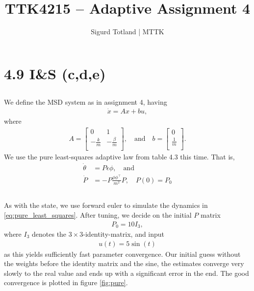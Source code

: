 \documentclass[]{article}
\title{TTK4215 – Adaptive Assignment 4}
\author{Sigurd Totland | MTTK}
\begin{document}
\maketitle

\section{4.9 I\&S (c,d,e)}
\setcounter{subsection}{2}
\subsection{}
We define the MSD system as in assignment 4, having
\begin{equation}\begin{aligned}
\dot x = Ax + bu,
\end{aligned}\end{equation}
where
\begin{equation}\begin{aligned}
A =
\begin{bmatrix}
0 & 1 \\
-\frac{k}{m} & -\frac{\beta}{m} \\
\end{bmatrix}, \quad \text{and} \quad
b =
\begin{bmatrix}
0\\
\frac{1}{m}\\
\end{bmatrix}.
\end{aligned}\end{equation}
We use the pure least-squares adaptive law from table 4.3 this time. That is,
\begin{equation}\begin{aligned}
\label{eq:pure_least_squares}
\dot \theta &= P \epsilon \phi, \quad \text{and} \\
\dot P &= -P \frac{\phi \phi^\top}{m^2}P, \quad P(0) = P_0
\end{aligned}\end{equation}
\subsection{}
As with the state, we use forward euler to simulate the dynamics in \eqref{eq:pure_least_squares}.
After tuning, we decide on the initial $P$ matrix
\begin{equation}\begin{aligned}
P_0 = 10I_3,
\end{aligned}\end{equation}
where $I_3$ denotes the $3 \times 3$-identity-matrix, and input
\begin{equation}\begin{aligned}
u(t) = 5 \sin(t)
\end{aligned}\end{equation}
as this yields sufficiently fast parameter convergence. Our initial guess without the weights before the identity matrix and the sine, the estimates converge very slowly to the real value and ends up with a significant error in the end. The good convergence is plotted in figure \ref{fig:pure}.
\end{document}
